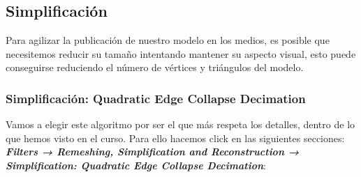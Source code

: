 \documentclass[options]{article}
\begin{document}
\pagebreak

\subsection{Simplificación}

Para agilizar la publicación de nuestro modelo en los medios, es posible que necesitemos reducir su tamaño intentando mantener su aspecto visual, esto puede conseguirse reduciendo el número de vértices y triángulos del modelo.

\subsubsection{Simplificación: Quadratic Edge Collapse Decimation}

Vamos a elegir este algoritmo por ser el que más respeta los detalles, dentro de lo que hemos visto en el curso. Para ello hacemos click en las siguientes secciones: \textbf{\textit{Filters → Remeshing, Simplification and Reconstruction → Simplification: Quadratic Edge Collapse Decimation}}:
\end{document}
